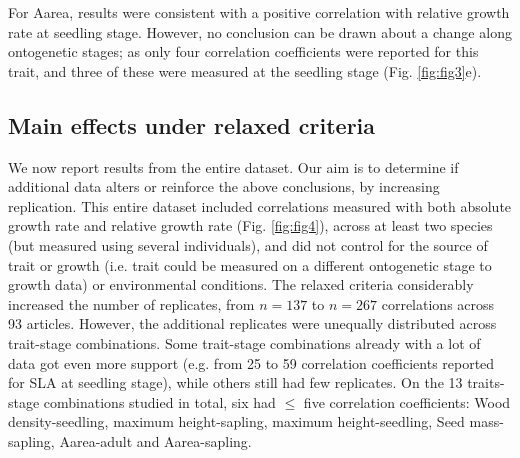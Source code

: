 \documentclass[a4paper,11pt]{article}
\begin{document}
For Aarea, results were consistent with a positive correlation with relative growth rate at seedling stage. However, no conclusion can be drawn about a change along ontogenetic stages; as only four correlation coefficients were reported for this trait, and three of these were measured at the seedling stage (Fig. \ref{fig:fig3}e).


\subsection*{Main effects under relaxed criteria}

We now report results from the entire dataset. Our aim is to determine if additional data alters or reinforce the above conclusions, by increasing replication. This entire dataset included correlations measured with both absolute growth rate and relative growth rate (Fig. \ref{fig:fig4}), across at least two species (but measured using several individuals), and did not control for the source of trait or growth (i.e. trait could be measured on a different ontogenetic stage to growth data) or environmental conditions. The relaxed criteria considerably increased the number of replicates, from $n = 137$ to $n = 267$ correlations across 93 articles. However, the additional replicates were unequally distributed across trait-stage combinations. Some trait-stage combinations already with a lot of data got even more support (e.g. from 25 to 59 correlation coefficients reported for SLA at seedling stage), while others still had few replicates. On the 13 traits-stage combinations studied in total, six had $\le$ five correlation coefficients: Wood density-seedling, maximum height-sapling, maximum height-seedling, Seed mass-sapling, Aarea-adult and Aarea-sapling.

\end{document}
